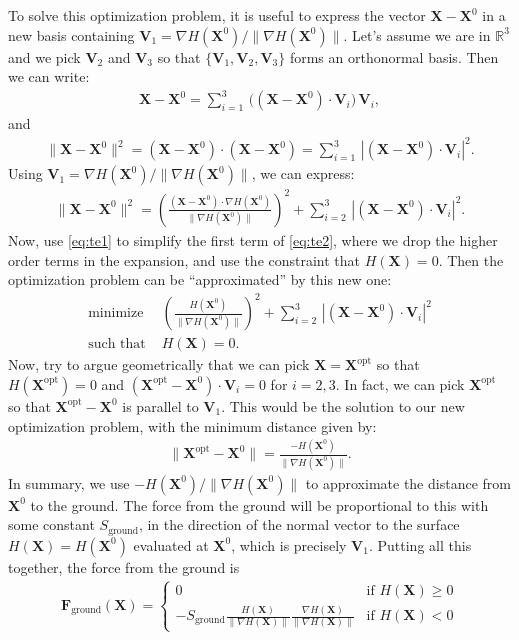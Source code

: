 \documentclass[10pt]{article}
\newcommand{\bs}[1]{{\boldsymbol #1}}
\begin{document}
To solve this optimization problem, it is useful to express the vector ${\bs X} - {\bs X}^0$ in a new basis containing ${\bs V}_1 = \nabla H({\bs X}^0) / \|  \nabla H({\bs X}^0) \|$.  Let's assume we are in $\mathbb{R}^3$ and we pick ${\bs V}_2$ and ${\bs V}_3$ so that $\{ {\bs V}_1,  {\bs V}_2,  {\bs V}_3 \}$ forms an orthonormal basis.  Then we can write:
\begin{align*}
{\bs X} - {\bs X}^0 = \sum_{i=1}^3 \, \Big(({\bs X} - {\bs X}^0) \cdot {\bs V}_i \Big) \, {\bs V}_i, 
\end{align*} 
and
\textbf{\begin{align*}
\|{\bs X} - {\bs X}^0\|^2 = ({\bs X} - {\bs X}^0) \cdot ({\bs X} - {\bs X}^0) = \sum_{i=1}^3 \, |({\bs X} - {\bs X}^0) \cdot {\bs V}_i|^2. 
\end{align*} }
Using ${\bs V}_1 = \nabla H({\bs X}^0) / \|  \nabla H({\bs X}^0) \|$, we can express:
\begin{align}
\label{eq:te2}
\|{\bs X} - {\bs X}^0\|^2 = \left(\frac{({\bs X} - {\bs X}^0) \cdot \nabla H({\bs X}^0)}{\|  \nabla H({\bs X}^0) \|} \right)^2 +  \sum_{i=2}^3 \, |({\bs X} - {\bs X}^0) \cdot {\bs V}_i|^2. 
\end{align} 
Now, use \eqref{eq:te1} to simplify the first term of \eqref{eq:te2}, where we drop the higher order terms in the expansion, and use the constraint that $H({\bs X}) = 0$.  Then the optimization problem can be ``approximated'' by this new one:
\begin{align*}
\text{minimize }&\left(\frac{H({\bs X}^0)}{\|  \nabla H({\bs X}^0) \|}\right)^2 +  \sum_{i=2}^3 \, |({\bs X} - {\bs X}^0) \cdot {\bs V}_i|^2 \\
\text{such that }&H({\bs X}) = 0.
\end{align*} 
Now, try to argue geometrically that we can pick ${\bs X} = {\bs X}^\text{opt}$ so that $H({\bs X}^\text{opt}) = 0$ and $({\bs X}^\text{opt} - {\bs X}^0) \cdot {\bs V}_i = 0$ for $i = 2, 3$.  In fact, we can pick ${\bs X}^\text{opt}$ so that ${\bs X}^\text{opt} - {\bs X}^0$ is parallel to ${\bs V}_1$.  This would be the solution to our new optimization problem, with the minimum distance given by:
\begin{align*}
\| {\bs X}^\text{opt} - {\bs X}^0 \| = \frac{-H({\bs X}^0)}{\|  \nabla H({\bs X}^0) \|}.
\end{align*} 
In summary, we use $-H({\bs X}^0) /\|  \nabla H({\bs X}^0)\|$ to approximate the distance from ${\bs X}^0$ to the ground.  The force from the ground will be proportional to this with some constant $S_\text{ground}$, in the direction of the normal vector to the surface $H({\bs X}) = H({\bs X}^0)$ evaluated at ${\bs X}^0$, which is precisely ${\bs V}_1$.  Putting all this together, the force from the ground is
\begin{align*}
{\bs F}_\text{ground}({\bs X}) = 
\begin{cases}
0 & \text{if }H({\bs X}) \geq 0 \\
-S_\text{ground} \frac{H({\bs X})}{\|\nabla H({\bs X})\|} \frac{\nabla H({\bs X})}{\|\nabla H({\bs X})\|} & \text{if }H({\bs X}) < 0
\end{cases}
\end{align*}
\end{document}
